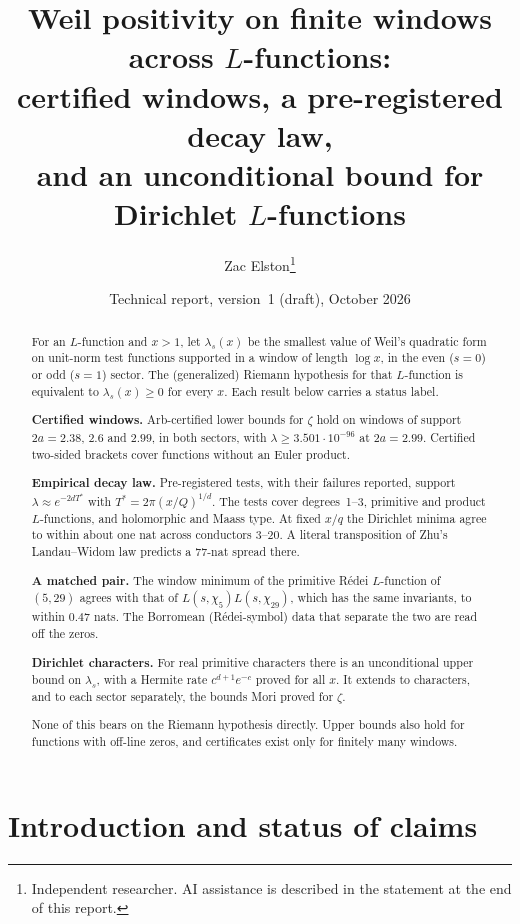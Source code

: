 \documentclass[11pt]{article}
\title{Weil positivity on finite windows across $L$-functions:\\
certified windows, a pre-registered decay law,\\
and an unconditional bound for Dirichlet $L$-functions}
\author{Zac Elston\thanks{Independent researcher. AI assistance is described in the statement at the end of this report.}}
\date{Technical report, version~1 (draft), October 2026}
\theoremstyle{remark}
\begin{document}
\maketitle

\begin{abstract}
For an $L$-function and $x>1$, let $\lambda_s(x)$ be the smallest value of Weil's quadratic form on unit-norm test functions supported in a window of length $\log x$, in the even ($s=0$) or odd ($s=1$) sector. The (generalized) Riemann hypothesis for that $L$-function is equivalent to $\lambda_s(x)\ge 0$ for every $x$. Each result below carries a status label.

\textbf{Certified windows.} Arb-certified lower bounds for $\zeta$ hold on windows of support $2a=2.38$, $2.6$ and $2.99$, in both sectors, with $\lambda\ge 3.501\cdot10^{-96}$ at $2a=2.99$. Certified two-sided brackets cover functions without an Euler product.

\textbf{Empirical decay law.} Pre-registered tests, with their failures reported, support $\lambda\approx e^{-2dT^*}$ with $T^*=2\pi(x/Q)^{1/d}$. The tests cover degrees~1--3, primitive and product $L$-functions, and holomorphic and Maass type. At fixed $x/q$ the Dirichlet minima agree to within about one nat across conductors $3$--$20$. A literal transposition of Zhu's Landau--Widom law predicts a $77$-nat spread there.

\textbf{A matched pair.} The window minimum of the primitive Rédei $L$-function of $(5,29)$ agrees with that of $L(s,\chi_5)L(s,\chi_{29})$, which has the same invariants, to within $0.47$ nats. The Borromean (Rédei-symbol) data that separate the two are read off the zeros.

\textbf{Dirichlet characters.} For real primitive characters there is an unconditional upper bound on $\lambda_s$, with a Hermite rate $c^{d+1}e^{-c}$ proved for all $x$. It extends to characters, and to each sector separately, the bounds Mori proved for $\zeta$.

None of this bears on the Riemann hypothesis directly. Upper bounds also hold for functions with off-line zeros, and certificates exist only for finitely many windows.
\end{abstract}

\section{Introduction and status of claims}
\end{document}
